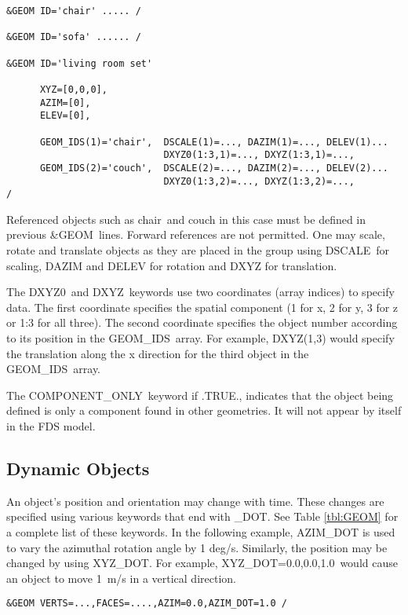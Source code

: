 \documentclass[12pt]{article}
\begin{document}
{\small
\begin{verbatim}
&GEOM ID='chair' ..... /

&GEOM ID='sofa' ...... /

&GEOM ID='living room set'

      XYZ=[0,0,0],
      AZIM=[0],
      ELEV=[0],

      GEOM_IDS(1)='chair',  DSCALE(1)=..., DAZIM(1)=..., DELEV(1)...
                            DXYZ0(1:3,1)=..., DXYZ(1:3,1)=...,
      GEOM_IDS(2)='couch',  DSCALE(2)=..., DAZIM(2)=..., DELEV(2)...
                            DXYZ0(1:3,2)=..., DXYZ(1:3,2)=...,
/
\end{verbatim}
}

\noindent Referenced objects such as {\ct chair}\ and {\ct couch} in this case must be defined in
previous {\&GEOM}\ lines.  Forward references are not permitted.
One may scale, rotate and translate objects as they are placed in the group using
{\ct DSCALE}\, for scaling, {\ct DAZIM} and {\ct DELEV} for rotation and {\ct DXYZ} for translation.

The {\ct DXYZ0}\ and {\ct DXYZ}\ keywords use two coordinates (array indices) to specify data.
The first coordinate specifies the spatial component (1 for x, 2 for y, 3 for z or 1:3 for all three).
The second coordinate specifies the object number according to its position in the {\ct GEOM\_IDS}\ array.
For example,
DXYZ(1,3) would specify the translation along the x direction for the third object in the {\ct GEOM\_IDS}\ array.

The {\ct COMPONENT\_ONLY}\ keyword if .TRUE., indicates that the object being defined is only a component found in other geometries.
It will not appear by itself in the FDS model.

\subsection{Dynamic Objects}
An object's position and orientation may change with time.
These changes are specified using various keywords that end with {\ct \_DOT}.
See Table \ref{tbl:GEOM} for a complete list of these keywords.
In the following example, {\ct AZIM\_DOT} is used to vary the azimuthal rotation angle by 1 deg/s.
Similarly, the position may be changed by using {\ct XYZ\_DOT}.
For example, {\ct XYZ\_DOT=0.0,0.0,1.0}\ would cause an object to move 1~m/s in a vertical direction.
{\small
\begin{verbatim}
&GEOM VERTS=...,FACES=....,AZIM=0.0,AZIM_DOT=1.0 /
\end{verbatim}
}
\end{document}
